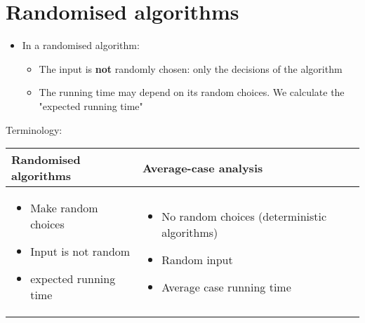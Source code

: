 \documentclass{article}[18pt]
\begin{document}
\section{Randomised algorithms}
\begin{itemize}
	\item In a randomised algorithm:
	\begin{itemize}
		\item The input is \textbf{not} randomly chosen: only the decisions of the algorithm
		\item The running time may depend on its random choices. We calculate the "expected running time"
	\end{itemize}
\end{itemize}
\begin{center}
	Terminology:
\end{center}
\begin{tabularx}{\textwidth}{|X |X |}
\hline
Randomised algorithms& Average-case analysis\\
\hline
\begin{itemize}
	\item Make random choices
	\item Input is not random
	\item expected running time
\end{itemize}
&\begin{itemize}
	\item No random choices (deterministic algorithms)
	\item Random input
	\item Average case running time
\end{itemize}\\
\hline
\end{tabularx}
\end{document}
